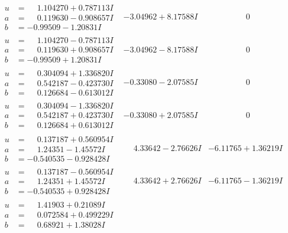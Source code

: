 \documentclass[1p]{elsarticle_modified}
\theoremstyle{definition}
\begin{document}
$$\begin{array}{c|c|c}
\begin{aligned}
u &= \phantom{-}1.104270 + 0.787113 I \\
a &= \phantom{-}0.119630 - 0.908657 I \\
b &= -0.99509 - 1.20831 I\end{aligned}
 & -3.04962 + 8.17588 I & \phantom{-0.000000 } 0 \\ \hline\begin{aligned}
u &= \phantom{-}1.104270 - 0.787113 I \\
a &= \phantom{-}0.119630 + 0.908657 I \\
b &= -0.99509 + 1.20831 I\end{aligned}
 & -3.04962 - 8.17588 I & \phantom{-0.000000 } 0 \\ \hline\begin{aligned}
u &= \phantom{-}0.304094 + 1.336820 I \\
a &= \phantom{-}0.542187 - 0.423730 I \\
b &= \phantom{-}0.126684 - 0.613012 I\end{aligned}
 & -0.33080 - 2.07585 I & \phantom{-0.000000 } 0 \\ \hline\begin{aligned}
u &= \phantom{-}0.304094 - 1.336820 I \\
a &= \phantom{-}0.542187 + 0.423730 I \\
b &= \phantom{-}0.126684 + 0.613012 I\end{aligned}
 & -0.33080 + 2.07585 I & \phantom{-0.000000 } 0 \\ \hline\begin{aligned}
u &= \phantom{-}0.137187 + 0.560954 I \\
a &= \phantom{-}1.24351 - 1.45572 I \\
b &= -0.540535 - 0.928428 I\end{aligned}
 & \phantom{-}4.33642 - 2.76626 I & -6.11765 + 1.36219 I \\ \hline\begin{aligned}
u &= \phantom{-}0.137187 - 0.560954 I \\
a &= \phantom{-}1.24351 + 1.45572 I \\
b &= -0.540535 + 0.928428 I\end{aligned}
 & \phantom{-}4.33642 + 2.76626 I & -6.11765 - 1.36219 I \\ \hline\begin{aligned}
u &= \phantom{-}1.41903 + 0.21089 I \\
a &= \phantom{-}0.072584 + 0.499229 I \\
b &= \phantom{-}0.68921 + 1.38028 I\end{aligned}

\end{array}$$
\end{document}
